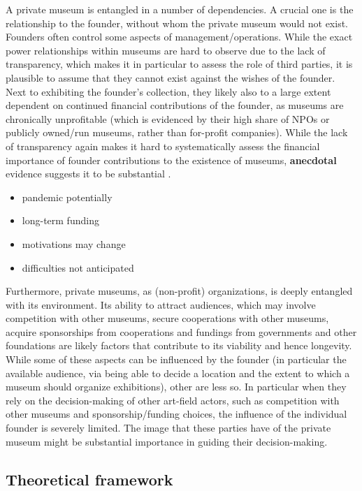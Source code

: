 \documentclass[12pt]{article}
\begin{document}
A private museum is entangled in a number of dependencies.
A crucial one is the relationship to the founder, without whom the private museum would not exist.
Founders often control some aspects of management/operations.
While the exact power relationships within museums are hard to observe due to the lack of transparency, which makes it in particular to assess the role of third parties, it is plausible to assume that they cannot exist against the wishes of the founder.
Next to exhibiting the founder's collection, they likely also to a large extent dependent on continued financial contributions of the founder, as museums are chronically unprofitable (which is evidenced by their high share of NPOs or publicly owned/run museums, rather than for-profit companies). 
While the lack of transparency again makes it hard to systematically assess the financial importance of founder contributions to the existence of museums, \textbf{anecdotal} evidence suggests it to be substantial \parencite{Velthuis_Gera_forthcoming_fragility}.
\textcite{Adam_2021_rise}
\begin{itemize}
\item pandemic potentially
\item long-term funding
\item motivations may change
\item difficulties not anticipated
\end{itemize}




Furthermore, private museums, as (non-profit) organizations, is deeply entangled with its environment.
Its ability to attract audiences, which may involve competition with other museums, secure cooperations with other museums, acquire sponsorships from cooperations and fundings from governments and other foundations are likely factors that contribute to its viability and hence longevity.
While some of these aspects can be influenced by the founder (in particular the available audience, via being able to decide a location and the extent to which a museum should organize exhibitions), other are less so.
In particular when they rely on the decision-making of other art-field actors, such as competition with other museums and sponsorship/funding choices, the influence of the individual founder is severely limited.
The image that these parties have of the private museum might be substantial importance in guiding their decision-making.




\subsection*{Theoretical framework}
\end{document}
